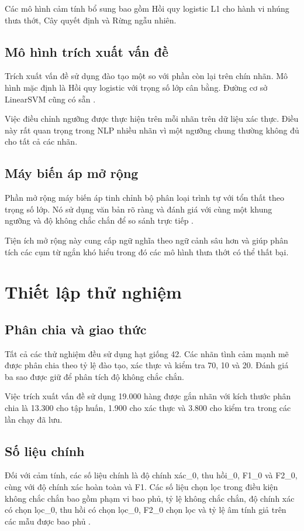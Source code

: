 \documentclass[12pt,a4paper]{article}
\begin{document}
Các mô hình cảm tính bổ sung bao gồm Hồi quy logistic L1 cho hành vi nhúng thưa thớt, Cây quyết định và Rừng ngẫu nhiên.

\subsection{Mô hình trích xuất vấn đề}
Trích xuất vấn đề sử dụng đào tạo một so với phần còn lại trên chín nhãn. Mô hình mặc định là Hồi quy logistic với trọng số lớp cân bằng. Đường cơ sở LinearSVM cũng có sẵn \cite{rifkin2004,zhang2014}.

Việc điều chỉnh ngưỡng được thực hiện trên mỗi nhãn trên dữ liệu xác thực. Điều này rất quan trọng trong NLP nhiều nhãn vì một ngưỡng chung thường không đủ cho tất cả các nhãn.

\subsection{Máy biến áp mở rộng}
Phần mở rộng máy biến áp tinh chỉnh bộ phân loại trình tự với tổn thất theo trọng số lớp. Nó sử dụng văn bản rõ ràng và đánh giá với cùng một khung ngưỡng và độ không chắc chắn để so sánh trực tiếp \cite{devlin2019}.

Tiện ích mở rộng này cung cấp ngữ nghĩa theo ngữ cảnh sâu hơn và giúp phân tích các cụm từ ngắn khó hiểu trong đó các mô hình thưa thớt có thể thất bại.

\section{Thiết lập thử nghiệm}
\subsection{Phân chia và giao thức}
Tất cả các thử nghiệm đều sử dụng hạt giống 42. Các nhãn tình cảm mạnh mẽ được phân chia theo tỷ lệ đào tạo, xác thực và kiểm tra 70, 10 và 20. Đánh giá ba sao được giữ để phân tích độ không chắc chắn.

Việc trích xuất vấn đề sử dụng 19.000 hàng được gắn nhãn với kích thước phân chia là 13.300 cho tập huấn, 1.900 cho xác thực và 3.800 cho kiểm tra trong các lần chạy đã lưu.

\subsection{Số liệu chính}
Đối với cảm tính, các số liệu chính là độ chính xác\_0, thu hồi\_0, F1\_0 và F2\_0, cùng với độ chính xác hoàn toàn và F1. Các số liệu chọn lọc trong điều kiện không chắc chắn bao gồm phạm vi bao phủ, tỷ lệ không chắc chắn, độ chính xác có chọn lọc\_0, thu hồi có chọn lọc\_0, F2\_0 chọn lọc và tỷ lệ âm tính giả trên các mẫu được bao phủ \cite{saito2015}.
\end{document}
